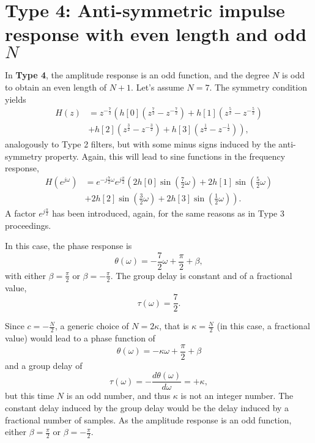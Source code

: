 \documentclass[\documentfontsize, twocolumn]{\classname}
\begin{document}
\section{Type 4: Anti-symmetric impulse response with even length and odd $N$}
In \textbf{Type 4}, the amplitude response is an odd function, and the degree $N$ is odd to obtain an even length of $N+1$. Let's assume $N=7$. The symmetry condition yields
\begin{align*}
    H(z) &= z^{-\frac 7 2}\left(h[0](z^{\frac 7 2} - z^{-\frac 7 2})
         + h[1](z^{\frac 5 2} - z^{-\frac 5 2})\right.\\
         & \left.+ h[2](z^{\frac 3 2} - z^{-\frac 32})
         + h[3](z^{\frac 1 2} - z^{-\frac 1 2})\right),
\end{align*}
analogously to Type 2 filters, but with some minus signs induced by the anti-symmetry property. Again, this will lead to sine functions in the frequency response,
\begin{align*}
    H(e^{j\omega}) &= e^{-j\frac 7 2 \omega} e^{j\frac \pi 2} \left(2h[0]\sin{(\frac 7 2 \omega)} + 2h[1] \sin{(\frac 5 2 \omega)}\right.\\
    &\left. + 2h[2]\sin{(\frac 3 2 \omega)} + 2h[3] \sin{(\frac 1 2 \omega)} \right).
\end{align*}
A factor $e^{j\frac \pi 2}$ has been introduced, again, for the same reasons as in Type 3 proceedings.

In this case, the phase response is
\[
    \theta(\omega) = - \frac 7 2 \omega + \frac \pi 2 + \beta,
\]
with either $\beta=\frac \pi 2$ or $\beta = - \frac \pi 2$. The group delay is constant and of a fractional value,
\[
    \tau(\omega) = \frac 7 2.
\]

Since $c=-\frac N 2$, a generic choice of $N = 2\kappa$, that is $\kappa = \frac N 2$ (in this case, a fractional value) would lead to a phase function of
\begin{equation}\label{eqn:linearPhaseTypeIVPhaseFunction}
    \theta(\omega) = -\kappa\omega + \frac \pi 2 + \beta
\end{equation}
and a group delay of
\begin{equation}\label{eqn:linearPhaseTypeIVGroupDelay}
    \tau(\omega) = -\frac{d\theta(\omega)}{d\omega} = +\kappa,
\end{equation}
but this time $N$ is an odd number, and thus $\kappa$ is not an integer number. The constant delay induced by the group delay would be the delay induced by a fractional number of samples. As the amplitude response is an odd function, either $\beta=\frac \pi 2$ or $\beta=- \frac \pi 2$.
\end{document}
